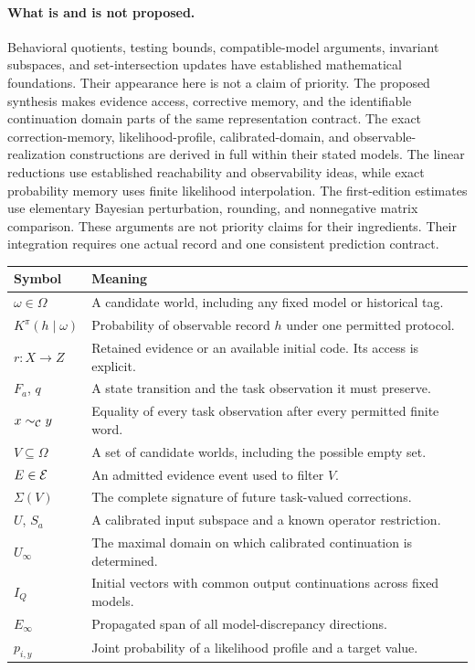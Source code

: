 \documentclass[11pt,letterpaper]{article}
\theoremstyle{plain}
\theoremstyle{definition}
\begin{document}
\paragraph{What is and is not proposed.}
Behavioral quotients, testing bounds, compatible-model arguments, invariant subspaces, and set-intersection updates have established mathematical foundations. Their appearance here is not a claim of priority. The proposed synthesis makes evidence access, corrective memory, and the identifiable continuation domain parts of the same representation contract. The exact correction-memory, likelihood-profile, calibrated-domain, and observable-realization constructions are derived in full within their stated models. The linear reductions use established reachability and observability ideas, while exact probability memory uses finite likelihood interpolation. The first-edition estimates use elementary Bayesian perturbation, rounding, and nonnegative matrix comparison. These arguments are not priority claims for their ingredients. Their integration requires one actual record and one consistent prediction contract.

\begin{center}\small
\begin{tabularx}{\textwidth}{@{}lX@{}}\toprule
Symbol & Meaning\\\midrule
$\omega\in\Omega$ & A candidate world, including any fixed model or historical tag.\\
$K^\pi(h\mid\omega)$ & Probability of observable record $h$ under one permitted protocol.\\
$r:X\to Z$ & Retained evidence or an available initial code. Its access is explicit.\\
$F_a$, $q$ & A state transition and the task observation it must preserve.\\
$x\sim_{\mathcal C}y$ & Equality of every task observation after every permitted finite word.\\
$V\subseteq\Omega$ & A set of candidate worlds, including the possible empty set.\\
$E\in\mathcal E$ & An admitted evidence event used to filter $V$.\\
$\Sigma(V)$ & The complete signature of future task-valued corrections.\\
$U$, $S_a$ & A calibrated input subspace and a known operator restriction.\\
$U_\infty$ & The maximal domain on which calibrated continuation is determined.\\
$I_Q$ & Initial vectors with common output continuations across fixed models.\\
$E_\infty$ & Propagated span of all model-discrepancy directions.\\
$p_{i,y}$ & Joint probability of a likelihood profile and a target value.\\\bottomrule
\end{tabularx}\end{center}
\clearpage
\end{document}
